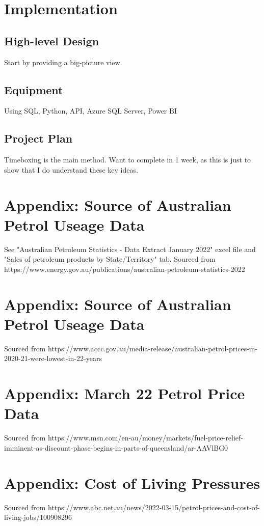\documentclass[10pt]{article} %
\begin{document}
\section{Implementation}

\subsection{High-level Design}
Start by providing a big-picture view. 

\subsection{Equipment}
Using SQL, Python, API, Azure SQL Server, Power BI


\subsection{Project Plan}
Timeboxing is the main method. Want to complete in 1 week, as this is just to show that I do understand these key ideas.

\appendix

\section{Appendix: Source of Australian Petrol Useage Data}
\label{appendix:petrolUsePerMonth}
See "Australian Petroleum Statistics - Data Extract January 2022" excel file  and "Sales of petroleum products by State/Territory" tab. Sourced from https://www.energy.gov.au/publications/australian-petroleum-statistics-2022

\section{Appendix: Source of Australian Petrol Useage Data}
\label{appendix:petrolPricePerMonth}
Sourced from https://www.accc.gov.au/media-release/australian-petrol-prices-in-2020-21-were-lowest-in-22-years

\section{Appendix: March 22 Petrol Price Data}
\label{appendix:MarchPetrolPricePerMonth}
Sourced from https://www.msn.com/en-au/money/markets/fuel-price-relief-imminent-as-discount-phase-begins-in-parts-of-queensland/ar-AAVlBG0

\section{Appendix: Cost of Living Pressures}
\label{appendix:CostOfLiving}
Sourced from https://www.abc.net.au/news/2022-03-15/petrol-prices-and-cost-of-living-jobs/100908296
\end{document}
